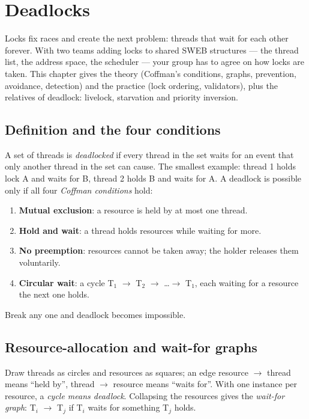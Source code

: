 \chapter{Deadlocks}
\label{ch:deadlocks}

Locks fix races and create the next problem: threads that wait for each
other forever. With two teams adding locks to shared SWEB structures ---
the thread list, the address space, the scheduler --- your group has to
agree on how locks are taken. This chapter gives the theory (Coffman's
conditions, graphs, prevention, avoidance, detection) and the practice
(lock ordering, validators), plus the relatives of deadlock: livelock,
starvation and priority inversion.

\section{Definition and the four conditions}

A set of threads is \emph{deadlocked} if every thread in the set waits
for an event that only another thread in the set can cause. The smallest
example: thread 1 holds lock A and waits for B, thread 2 holds B and waits
for A. A deadlock is possible only if all four \emph{Coffman conditions}
hold:

\begin{enumerate}
  \item \textbf{Mutual exclusion}: a resource is held by at most one
    thread.
  \item \textbf{Hold and wait}: a thread holds resources while waiting for
    more.
  \item \textbf{No preemption}: resources cannot be taken away; the holder
    releases them voluntarily.
  \item \textbf{Circular wait}: a cycle T$_1$ $\to$ T$_2$ $\to$ \dots $\to$
    T$_1$, each waiting for a resource the next one holds.
\end{enumerate}

Break any one and deadlock becomes impossible.

\section{Resource-allocation and wait-for graphs}

Draw threads as circles and resources as squares; an edge resource
$\to$ thread means ``held by'', thread $\to$ resource means ``waits
for''. With one instance per resource, a \emph{cycle means deadlock}.
Collapsing the resources gives the \emph{wait-for graph}: T$_i$ $\to$
T$_j$ if T$_i$ waits for something T$_j$ holds.

